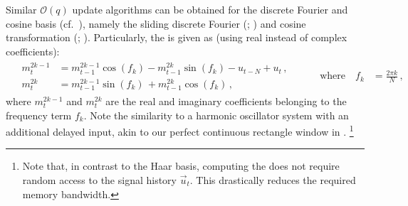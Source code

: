 Similar $\mathcal{O}(q)$ update algorithms can be obtained for the discrete Fourier and cosine basis (cf.~), namely the sliding discrete Fourier (\SDFT; \cite{springer1991sliding,jacobsen2003sliding}) and cosine transformation (\SDCT; \cite{kober2004fast}).
Particularly, the \SDFT is given as (using real instead of complex coefficients):
\begin{align}
	&\begin{aligned}
		m^{2k - 1}_t &= m^{2k -1}_{t - 1} \cos(f_k) - m^{2k}_{t - 1} \sin(f_k) - u_{t - N} + u_{t}\,, \\
		m^{2k}_t &= m^{2k - 1}_{t - 1}    \sin(f_k) \, + m^{2k}_{t - 1} \cos(f_k) \,,
	\end{aligned} & \quad\quad \text{where} \quad f_k &= \frac{2 \pi k}{N} \,,
	\label{eqn:sdft}
\end{align}
where $m_t^{2k - 1}$ and $m_t^{2k}$ are the real and imaginary coefficients belonging to the frequency term $f_k$.
Note the similarity to a harmonic oscillator \LTI system with an additional delayed input, akin to our perfect continuous \LTI rectangle window in .%
\footnote{Note that, in contrast to the Haar basis, computing the \SDFT does not require random access to the signal history $\vec u_t$. This drastically reduces the required memory bandwidth.}

\newcommand{\symLTI}{\texttt{[image: media/chapters/04\_temporal\_tuning/04\_04/sym\_lti.pdf]}}
\newcommand{\symSDT}{\texttt{[image: media/chapters/04\_temporal\_tuning/04\_04/sym\_sdt.pdf]}}
\newcommand{\symFIR}{\texttt{[image: media/chapters/04\_temporal\_tuning/04\_04/sym\_fir.pdf]}}

